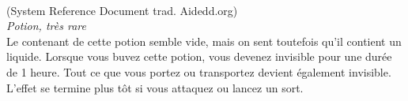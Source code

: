 \\
{\small (System Reference Document trad. Aidedd.org)}\\
{\small \it Potion, très rare}\\
Le contenant de cette potion semble vide, mais on sent toutefois qu'il contient un liquide. Lorsque vous buvez cette potion, vous devenez invisible pour une durée de 1 heure. Tout ce que vous portez ou transportez devient également invisible. L'effet se termine plus tôt si vous attaquez ou lancez un sort. \\

